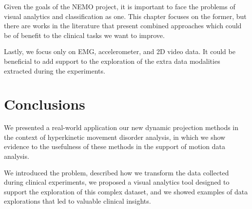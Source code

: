 Given the goals of the NEMO project, it is important to face the problems of visual analytics and classification as one. This chapter focuses on the former, but there are works in the literature that present combined approaches \citep{Graving2020.07.17.207993,rauber_aid} which could be of benefit to the clinical tasks we want to improve. 

Lastly, we focus only on EMG, accelerometer, and 2D video data. It could be beneficial to add support to the exploration of the extra data modalities extracted during the experiments.


\section{Conclusions}

We presented a real-world application our new dynamic projection methods in the context of hyperkinetic movement disorder analysis, in which we show evidence to the usefulness of these methods in the support of motion data analysis.

We introduced the problem, described how we transform the data collected during clinical experiments, we proposed a visual analytics tool designed to support the exploration of this complex dataset, and we showed examples of data explorations that led to valuable clinical insights.

